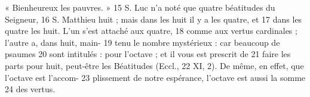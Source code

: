 « Bienheureux les pauvres. »	 
15	 	S. Luc n'a noté que quatre béatitudes du Seigneur,	 
16	 	S. Matthieu huit ; mais dans les huit il y a les quatre, et	 
17	 	dans les quatre les huit. L'un s'est attaché aux quatre,	 
18	 	comme aux vertus cardinales ; l'autre a, dans huit, main-	 
19	 	tenu le nombre mystérieux : car beaucoup de psaumes	 
20	 	sont intitulés : pour l'octave ; et il vous est prescrit de	 
21	 	faire les parts pour huit, peut-être les Béatitudes (Eccl.,	 
22	 	XI, 2). De même, en effet, que l'octave est l'accom-	 
23	 	plissement de notre espérance, l'octave est aussi la somme	 
24	 	des vertus.